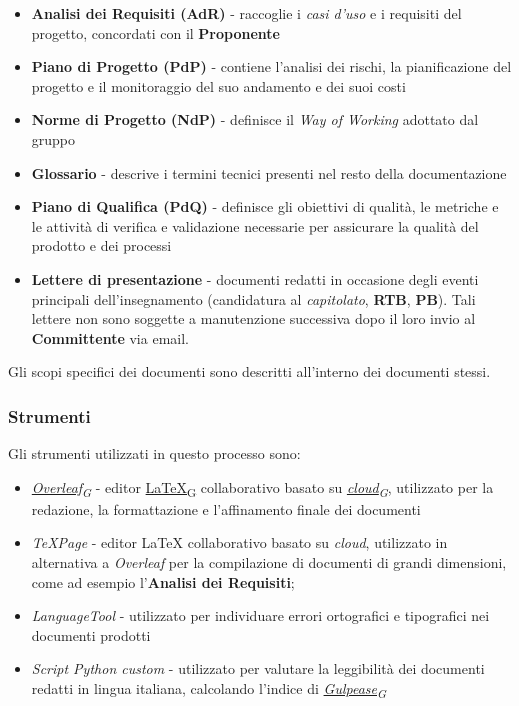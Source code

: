 \documentclass[12pt, a4paper]{article}
\newcommand{\urlglossario}{https://skynetunigroup.github.io/Code_Guardian/Documentazione/RTB/glossario_v1.0.0.pdf} %
\newcommand{\glo}[2]{\href{\urlglossario\#nameddest=#2}{#1\textsubscript{G}}}
\begin{document}
\begin{itemize}
    \item \textbf{Analisi dei Requisiti (AdR)} - raccoglie i \textit{casi d'uso} e i requisiti del progetto, concordati con il \textbf{Proponente}

    \item \textbf{Piano di Progetto (PdP)} - contiene l'analisi dei rischi, la pianificazione del progetto e il monitoraggio del suo andamento e dei suoi costi

    \item \textbf{Norme di Progetto (NdP)} - definisce il \textit{Way of Working} adottato dal gruppo

    \item \textbf{Glossario} - descrive i termini tecnici presenti nel resto della documentazione

    \item \textbf{Piano di Qualifica (PdQ)} - definisce gli obiettivi di qualità, le metriche e le attività di verifica e validazione necessarie per assicurare la qualità del prodotto e dei processi

    \item \textbf{Lettere di presentazione} - documenti redatti in occasione degli eventi principali dell'insegnamento (candidatura al \textit{capitolato}, \textbf{RTB}, \textbf{PB}). Tali lettere non sono soggette a manutenzione successiva dopo il loro invio al \textbf{Committente} via email.
\end{itemize}

Gli scopi specifici dei documenti sono descritti all'interno dei documenti stessi.

\subsubsection{Strumenti}
Gli strumenti utilizzati in questo processo sono:

\begin{itemize}
    \item \textit{\glo{Overleaf}{overleaf}} - editor \glo{\LaTeX{}}{latex} collaborativo basato su \textit{\glo{cloud}{cloud}}, utilizzato per la redazione, la formattazione e l'affinamento finale dei documenti

    \item \textit{TeXPage} - editor \LaTeX{} collaborativo basato su \textit{{cloud}}, utilizzato in alternativa a \textit{Overleaf} per la compilazione di documenti di grandi dimensioni, come ad esempio l'\textbf{Analisi dei Requisiti};

    \item \textit{LanguageTool} - utilizzato per individuare errori ortografici e tipografici nei documenti prodotti

    \item \textit{Script Python custom} - utilizzato per valutare la leggibilità dei documenti redatti in lingua italiana, calcolando l'indice di \textit{\glo{Gulpease}{gulpease}}
\end{itemize}
\end{document}
